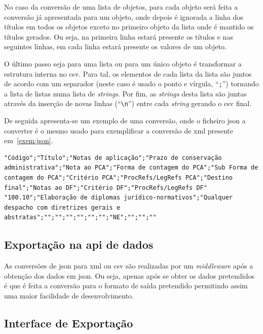 No caso da conversão de uma lista de objetos, para cada objeto será feita a conversão já apresentada para um objeto, onde depois é ignorada a linha dos títulos em todos os objetos exceto no primeiro objeto da lista onde é mantido os títulos gerados. Ou seja, na primeira linha estará presente os títulos e nas seguintes linhas, em cada linha estará presente os valores de um objeto.

O último passo seja para uma lista ou para um único objeto é transformar a estrutura interna no \acrshort{csv}. Para tal, os elementos de cada lista da lista são juntos de acordo com um separador (neste caso é usado o ponto e vírgula, ``\texttt{;}'') tornando a lista de listas numa lista de \textit{strings}. Por fim, as \textit{strings} desta lista são juntas através da inserção de novas linhas (``\texttt{\textbackslash{}n}'') entre cada \textit{string} gerando o \acrshort{csv} final.

De seguida apresenta-se um exemplo de uma conversão, onde o ficheiro \acrshort{json} a converter é o mesmo usado para exemplificar a conversão de \acrshort{xml} presente em~\ref{exem:json}.

\begin{lstlisting}[language=pseudocode, caption=\acrshort{csv} resultante da conversão do \acrshort{json} presente em~\ref{exem:json}]
"Código";"Título";"Notas de aplicação";"Prazo de conservação administrativa";"Nota ao PCA";"Forma de contagem do PCA";"Sub Forma de contagem do PCA";"Critério PCA";"ProcRefs/LegRefs PCA";"Destino final";"Notas ao DF";"Critério DF";"ProcRefs/LegRefs DF"
"100.10";"Elaboração de diplomas jurídico-normativos";"Qualquer despacho com diretrizes gerais e abstratas";"";"";"";"";"";"";"NE";"";"";""
\end{lstlisting}

\subsection{Exportação na \acrshort{api} de dados}

As conversões de \acrshort{json} para \acrshort{xml} ou \acrshort{csv} são realizadas por um \textit{middleware} após a obtenção dos dados em \acrshort{json}. Ou seja, apenas após se obter os dados pretendidos é que é feita a conversão para o formato de saída pretendido permitindo assim uma maior facilidade de desenvolvimento.

\subsection{Interface de Exportação}

